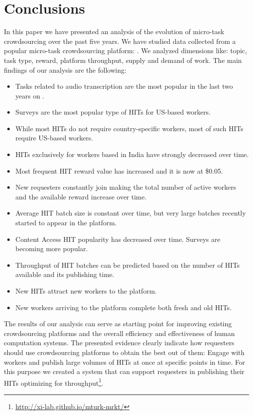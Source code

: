 \section{Conclusions}\label{sec:conc}

In this paper we have presented an analysis of the evolution of micro-task crowdsourcing over the past five years.
We have studied data collected from a popular micro-task crowdsourcing platform: \amt{}.
We analyzed dimensions like: topic, task type, reward, platform throughput, supply and demand of work.
The main findings of our analysis are the following:
\begin{itemize}
	\item Tasks related to audio transcription are the most popular in the last two years on \amt{}.
	\item Surveys are the most popular type of HITs for US-based workers.
	\item While most HITs do not require country-specific workers, most of such HITs require US-based workers.
	\item HITs exclusively for workers based in India have strongly decreased over time.
	\item Most frequent HIT reward value has increased and it is now at \$0.05.
	\item New requesters constantly join \amt{} making the total number of active workers and the available reward increase over time.
	\item Average HIT batch size is constant over time, but very large batches recently started to appear in the platform.
	\item Content Access HIT popularity has decreased over time. Surveys are becoming more popular.
	\item Throughput of HIT batches can be predicted based on the number of HITs available   and its publishing time.
	\item New HITs attract new workers to the platform.
	\item New workers arriving to the platform complete both fresh and old HITs.
\end{itemize}

The results of our analysis can serve as starting point for improving existing crowdsourcing platforms and the overall efficiency and effectiveness of human computation systems. The presented evidence clearly indicate how requesters should use crowdsourcing platforms to obtain the best out of them: Engage with workers and publish large volumes of HITs at once at specific points in time. For this purpose we created a system that can support requesters in publishing their HITs optimizing for throughput\footnote{\url{http://xi-lab.github.io/mturk-mrkt/}}.